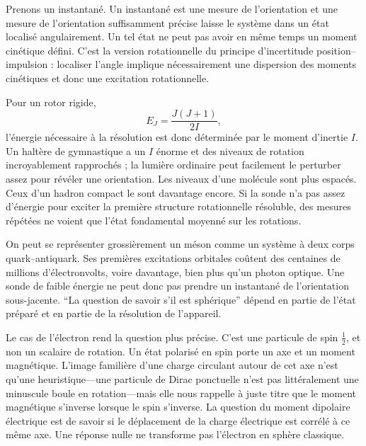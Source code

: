 Prenons un instantané. Un instantané est une mesure de l’orientation et une mesure de l’orientation suffisamment précise laisse le système dans un état localisé angulairement. Un tel état ne peut pas avoir en même temps un moment cinétique défini. C’est la version rotationnelle du principe d’incertitude position--impulsion : localiser l’angle implique nécessairement une dispersion des moments cinétiques et donc une excitation rotationnelle.

Pour un rotor rigide, \begin{equation}
E_J=\frac{J(J+1)}{2I},
\end{equation}l’énergie nécessaire à la résolution est donc déterminée par le moment d’inertie \(I\). Un haltère de gymnastique a un \(I\) énorme et des niveaux de rotation incroyablement rapprochés ; la lumière ordinaire peut facilement le perturber assez pour révéler une orientation. Les niveaux d’une molécule sont plus espacés. Ceux d’un hadron compact le sont davantage encore. Si la sonde n’a pas assez d’énergie pour exciter la première structure rotationnelle résoluble, des mesures répétées ne voient que l’état fondamental moyenné sur les rotations.

On peut se représenter grossièrement un méson comme un système à deux corps quark--antiquark. Ses premières excitations orbitales coûtent des centaines de millions d’électronvolts, voire davantage, bien plus qu’un photon optique. Une sonde de faible énergie ne peut donc pas prendre un instantané de l’orientation sous-jacente. ``La question de savoir s’il est sphérique'' dépend en partie de l’état préparé et en partie de la résolution de l’appareil.

Le cas de l’électron rend la question plus précise. C’est une particule de spin \(\tfrac12\), et non un scalaire de rotation. Un état polarisé en spin porte un axe et un moment magnétique. L’image familière d’une charge circulant autour de cet axe n’est qu’une heuristique---une particule de Dirac ponctuelle n’est pas littéralement une minuscule boule en rotation---mais elle nous rappelle à juste titre que le moment magnétique s’inverse lorsque le spin s’inverse. La question du moment dipolaire électrique est de savoir si le déplacement de la charge électrique est corrélé à ce même axe. Une réponse nulle ne transforme pas l’électron en sphère classique.

\begin{classroomqa}\end{classroomqa}

